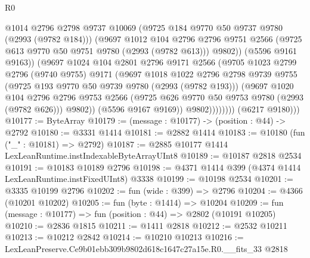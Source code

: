 \begin{lexlean}{R0}
\begin{coremodule}
                          @1014
                          @2796
                          @2798
                          @9737
                          @10069
                          (@9725 @184 @9770 @50 @9737 @9780 (@2993 (@9782 @184)))
                          (@9697
                            @1012
                            @104
                            @2796
                            @2796
                            @9751
                            @2566
                            (@9725 @613 @9770 @50 @9751 @9780 (@2993 (@9782 @613)))
                            @9802))
                        (@5596 @9161 @9163))
                      (@9697
                        @1024
                        @104
                        @2801
                        @2796
                        @9171
                        @2566
                        (@9705
                          @1023
                          @2799
                          @2796
                          (@9740 @9755)
                          @9171
                          (@9697
                            @1018
                            @1022
                            @2796
                            @2798
                            @9739
                            @9755
                            (@9725 @193 @9770 @50 @9739 @9780 (@2993 (@9782 @193)))
                            (@9697
                              @1020
                              @104
                              @2796
                              @2796
                              @9753
                              @2566
                              (@9725 @626 @9770 @50 @9753 @9780 (@2993 (@9782 @626)))
                              @9802))
                          (@5596 @9167 @9169))
                        @9802))))))))
        (@6217 @9180)))
@10177 := ByteArray
@10179 := (message : @10177) -> (position : @44) -> @2792
@10180 := @3331 @1414
@10181 := @2882 @1414
@10183 := @10180 (fun ("_" : @10181) => @2792)
@10187 := @2885 @10177 @1414 LexLeanRuntime.instIndexableByteArrayUInt8
@10189 := @10187 @2818 @2534
@10191 := @10183 @10189 @2796
@10198 := @4371 @1414 @399 (@4374 @1414 LexLeanRuntime.instFixedUInt8) @3338
@10199 := @10198 @2534
@10201 := @3335 @10199 @2796
@10202 := fun (wide : @399) => @2796
@10204 := @4366 (@10201 @10202)
@10205 := fun (byte : @1414) => @10204
@10209 := fun (message : @10177) => fun (position : @44) => @2802 (@10191 @10205)
@10210 := @2836 @1815
@10211 := @1411 @2818
@10212 := @2532 @10211
@10213 := @10212 @2842
@10214 := @10210 @10213
@10216 := LexLeanPreserve.Ce9b01ebb309b9802d618c1647c27a15e.R0.__fits_33 @2818

\end{coremodule}
\end{lexlean}
